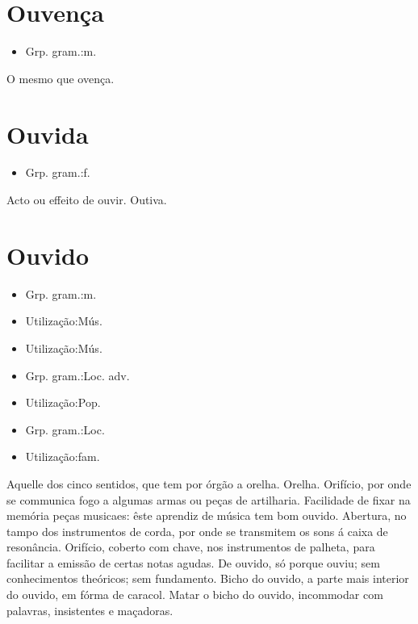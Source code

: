 \section{Ouvença}
\begin{itemize}
\item {Grp. gram.:m.}
\end{itemize}
O mesmo que \textunderscore ovença\textunderscore .
\section{Ouvida}
\begin{itemize}
\item {Grp. gram.:f.}
\end{itemize}
Acto ou effeito de ouvir.
Outiva.
\section{Ouvido}
\begin{itemize}
\item {Grp. gram.:m.}
\end{itemize}
\begin{itemize}
\item {Utilização:Mús.}
\end{itemize}
\begin{itemize}
\item {Utilização:Mús.}
\end{itemize}
\begin{itemize}
\item {Grp. gram.:Loc. adv.}
\end{itemize}
\begin{itemize}
\item {Utilização:Pop.}
\end{itemize}
\begin{itemize}
\item {Grp. gram.:Loc.}
\end{itemize}
\begin{itemize}
\item {Utilização:fam.}
\end{itemize}
Aquelle dos cinco sentidos, que tem por órgão a orelha.
Orelha.
Orifício, por onde se communica fogo a algumas armas ou peças de artilharia.
Facilidade de fixar na memória peças musicaes: \textunderscore êste aprendiz de música tem bom ouvido\textunderscore .
Abertura, no tampo dos instrumentos de corda, por onde se transmitem os sons á caixa de resonância.
Orifício, coberto com chave, nos instrumentos de palheta, para facilitar a emissão de certas notas agudas.
\textunderscore De ouvido\textunderscore , só porque ouviu; sem conhecimentos theóricos; sem fundamento.
\textunderscore Bicho do ouvido\textunderscore , a parte mais interior do ouvido, em fórma de caracol.
\textunderscore Matar o bicho do ouvido\textunderscore , incommodar com palavras, insistentes e maçadoras.
